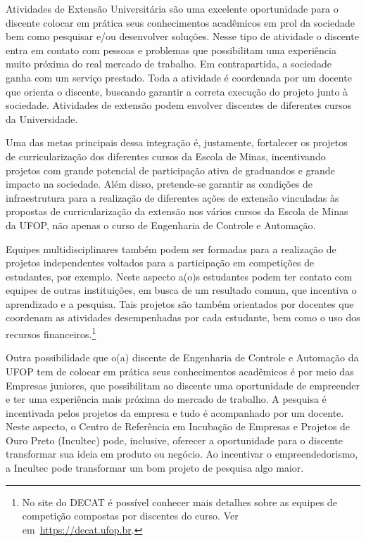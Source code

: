 \documentclass[
	12pt,				%
	openright,			%
	oneside,			%
	a4paper,			%
	english,			%
	brazil				%
	]{abntex2}
\begin{document}
Atividades de Extensão Universitária são uma excelente oportunidade para o discente colocar em prática seus conhecimentos acadêmicos em prol da sociedade bem como pesquisar e/ou desenvolver soluções. Nesse tipo de atividade o discente entra em contato com pessoas e problemas que possibilitam uma experiência muito próxima do real mercado de trabalho. Em contrapartida, a sociedade ganha com um serviço prestado. Toda a atividade é coordenada por um  docente que orienta o discente, buscando garantir a correta execução do projeto junto à sociedade. Atividades de extensão podem envolver discentes de diferentes cursos da Universidade.

Uma das metas principais dessa integração é, justamente, fortalecer os projetos de curricularização dos diferentes cursos da Escola de Minas, incentivando projetos com grande potencial de participação ativa de graduandos e grande impacto na sociedade. Além disso, pretende-se garantir as condições de infraestrutura para a realização de diferentes ações de extensão vinculadas às propostas de curricularização da extensão nos vários cursos da Escola de Minas da UFOP, não apenas o curso de Engenharia de Controle e Automação.

Equipes multidisciplinares também podem ser formadas para a realização de projetos independentes voltados para a participação em competições de estudantes, por exemplo. Neste aspecto a(o)s estudantes podem ter contato com equipes de outras instituições, em busca de um resultado comum, que incentiva o aprendizado e a pesquisa. Tais projetos são também orientados por docentes que coordenam as atividades desempenhadas por cada estudante, bem como o uso dos recursos financeiros.\footnote{No site do DECAT é possível conhecer mais detalhes sobre as equipes de competição compostas por discentes do curso. Ver em~\url{https://decat.ufop.br}.}


Outra possibilidade que o(a) discente de Engenharia de Controle e Automação da UFOP tem de colocar em prática seus conhecimentos acadêmicos é por meio das Empresas juniores, que possibilitam ao discente uma oportunidade de empreender e ter uma experiência mais próxima do mercado de trabalho. A pesquisa é incentivada pelos projetos da empresa e tudo é acompanhado por um docente. Neste aspecto, o Centro de Referência em Incubação de Empresas e Projetos de Ouro Preto (Incultec) pode, inclusive, oferecer a oportunidade para o discente transformar sua ideia em produto ou negócio. Ao incentivar o empreendedorismo, a Incultec pode transformar um bom projeto de pesquisa algo maior.
\end{document}

